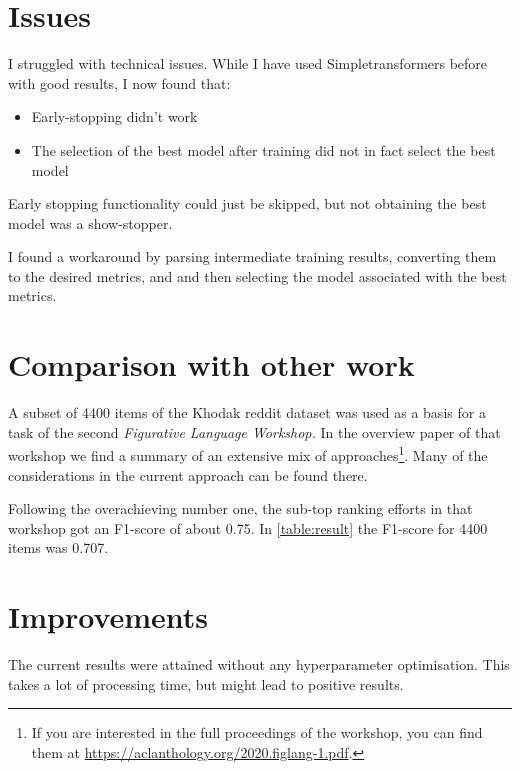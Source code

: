 \documentclass[11pt,a4paper]{article}
\begin{document}
\section{Issues}

I struggled with technical issues.  While I have used Simpletransformers before with good results, I now found that:
\begin{itemize}
\item{Early-stopping didn't work}
\item{The selection of the best model after training did not in fact select the best model}
\end{itemize}

Early stopping functionality could just be skipped, but not obtaining the best model was a show-stopper.\par

I found a workaround by parsing intermediate training results, converting them to the desired metrics, and and then selecting the model associated with the best metrics. 


\section{Comparison with other work}

A subset of 4400 items of the Khodak reddit dataset was used as a basis for a task of the second \textit{Figurative Language Workshop.}  In the overview paper of that workshop \cite{ghosh-etal-2020-report} we find a summary of an extensive mix of approaches\footnote{If you are interested in the full proceedings of the workshop, you can find them at \url{https://aclanthology.org/2020.figlang-1.pdf}.}. Many of the considerations in the current approach can be found there.\par 

Following the overachieving number one, the sub-top ranking efforts in that workshop got an F1-score of about 0.75.  In \ref{table:result} the F1-score for 4400 items was 0.707.


\section{Improvements}

The current results were attained without any hyperparameter optimisation.  This takes a lot of processing time, but might lead to positive results.\par
\end{document}
